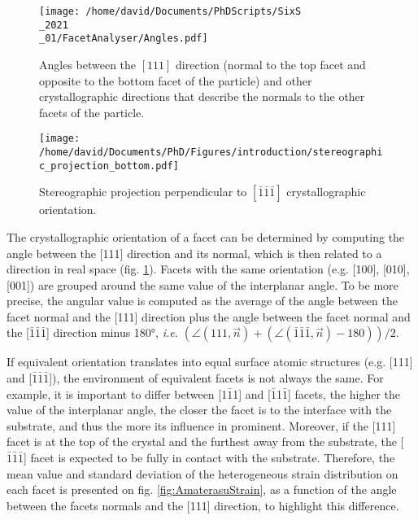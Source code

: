 \begin{figure}[!htb]
    \centering
    \texttt{[image: /home/david/Documents/PhDScripts/SixS\\\_2021\\\_01/FacetAnalyser/Angles.pdf]}
    \caption{
        Angles between the $[111]$ direction (normal to the top facet and opposite to the bottom facet of the particle) and other crystallographic directions that describe the normals to the other facets of the particle.
    }
    \label{fig:Angles}
\end{figure}

\begin{figure}[!htb]
    \centering   %
    \texttt{[image: /home/david/Documents/PhD/Figures/introduction/stereographic\_projection\_bottom.pdf]}
    \caption{
        Stereographic projection perpendicular to $[\bar{1}\bar{1}\bar{1}]$ crystallographic orientation.
    }
    \label{fig:StereoBottom}
\end{figure}

The crystallographic orientation of a facet can be determined by computing the angle between the [111] direction and its normal, which is then related to a direction in real space (fig. \ref{fig:Angles}).
Facets with the same orientation (e.g. [100], [010], [001]) are grouped around the same value of the interplanar angle.
To be more precise, the angular value is computed as the average of the angle between the facet normal and the [111] direction plus the angle between the facet normal and the [$\bar{1}\bar{1}\bar{1}$] direction minus \ang{180}, \textit{i.e.} $(\angle (111, \vec{n}) + (\angle (\bar{1}\bar{1}\bar{1}, \vec{n}) -180))/2$.

If equivalent orientation translates into equal surface atomic structures (e.g. [111] and [$\bar{1}\bar{1}\bar{1}$]), the environment of equivalent facets is not always the same.
For example, it is important to differ between [1$\bar{1}$1] and [$\bar{1}$1$\bar{1}$] facets, the higher the value of the interplanar angle, the closer the facet is to the interface with the substrate, and thus the more its influence in prominent.
Moreover, if the [111] facet is at the top of the crystal and the furthest away from the substrate, the [$\bar{1}\bar{1}\bar{1}$] facet is expected to be fully in contact with the substrate.
Therefore, the mean value and standard deviation of the heterogeneous strain distribution on each facet is presented on fig. \ref{fig:AmaterasuStrain}, as a function of the angle between the facets normals and the [111] direction, to highlight this difference.

